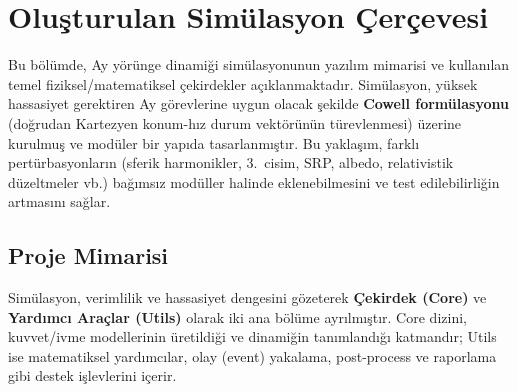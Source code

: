 \chapter{Oluşturulan Simülasyon Çerçevesi}
\label{ch:sim_framework}

Bu bölümde, Ay yörünge dinamiği simülasyonunun yazılım mimarisi ve kullanılan temel fiziksel/matematiksel çekirdekler açıklanmaktadır.
Simülasyon, yüksek hassasiyet gerektiren Ay görevlerine uygun olacak şekilde \textbf{Cowell formülasyonu} (doğrudan Kartezyen konum-hız durum vektörünün türevlenmesi) üzerine kurulmuş ve modüler bir yapıda tasarlanmıştır.
Bu yaklaşım, farklı pertürbasyonların (sferik harmonikler, 3.\ cisim, SRP, albedo, relativistik düzeltmeler vb.) bağımsız modüller halinde eklenebilmesini ve test edilebilirliğin artmasını sağlar.


\section{Proje Mimarisi}
Simülasyon, verimlilik ve hassasiyet dengesini gözeterek \textbf{Çekirdek (Core)} ve \textbf{Yardımcı Araçlar (Utils)} olarak iki ana bölüme ayrılmıştır.
Core dizini, kuvvet/ivme modellerinin üretildiği ve dinamiğin tanımlandığı katmandır; Utils ise matematiksel yardımcılar, olay (event) yakalama, post-process ve raporlama gibi destek işlevlerini içerir.

\medskip
{}


